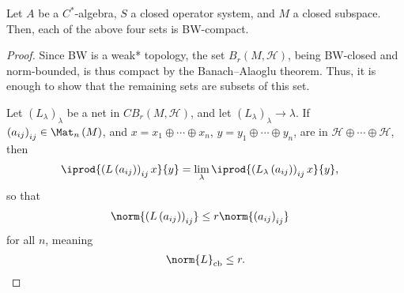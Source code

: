 \documentclass[10pt]{mypackage}
\DeclareMathOperator{\cb}{cb}
\begin{document}
\begin{theorem}
  Let $A$ be a $C^{\ast}$-algebra, $S$ a closed operator system, and $M$ a closed subspace. Then, each of the above four sets is BW-compact.
\end{theorem}
\begin{proof}
  Since BW is a weak* topology, the set $B_r\left( M,\mathcal{H} \right)$, being BW-closed and norm-bounded, is thus compact by the Banach--Alaoglu theorem. Thus, it is enough to show that the remaining sets are subsets of this set.\newline

  Let $\left( L_{\lambda} \right)_{\lambda}$ be a net in $CB_r\left( M,\mathcal{H} \right)$, and let $\left( L_{\lambda} \right)_{\lambda}\rightarrow \lambda$. If $\left( a_{ij} \right)_{ij}\in \Mat_n\left( M \right)$, and $x = x_1\oplus\cdots\oplus x_n$, $y = y_1\oplus\cdots\oplus y_n$, are in $\mathcal{H}\oplus\cdots\oplus \mathcal{H}$, then
  \begin{align*}
    \iprod{\left( L\left( a_{ij} \right) \right)_{ij}x}{y} &= \lim_{\lambda} \iprod{\left( L_{\lambda}\left( a_{ij} \right) \right)_{ij}x}{y},
  \end{align*}
  so that
  \begin{align*}
    \norm{\left( L\left( a_{ij} \right) \right)_{ij}} &\leq r\norm{\left( a_{ij} \right)_{ij}}
  \end{align*}
  for all $n$, meaning
  \begin{align*}
    \norm{L}_{\cb}\leq r.
  \end{align*}
\end{proof}
\end{document}
